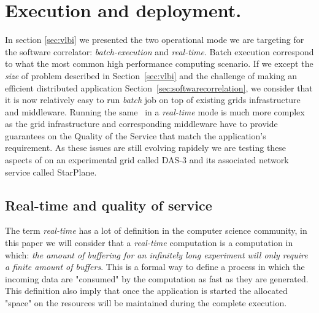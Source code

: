 \section{Execution and deployment.}\label{sec:network}
In section \ref{sec:vlbi} we presented the two operational 
mode we are targeting for the software correlator: \emph{batch-execution} 
and \emph{real-time}. Batch execution correspond to what the most common 
high performance computing scenario. If we except the \emph{size} 
of problem described in Section~\ref{sec:vlbi} and the 
challenge of making an efficient distributed application 
Section~\ref{sec:softwarecorrelation}, we consider that it is now relatively 
easy to run \emph{batch} job on top of existing grids 
infrastructure and middleware. Running the same \scarie~in a 
\emph{real-time} mode is much more complex as the grid 
infrastructure and corresponding middleware have to provide 
guarantees on the Quality of the Service that match 
the application's requirement. As these issues are still 
evolving rapidely we are testing these aspects of \scarie on 
an experimental grid called DAS-3 and its associated network 
service called StarPlane.

\subsection{Real-time and quality of service}
The term \emph{real-time} has a lot of definition in the computer science community, 
in this paper we will consider that a \emph{real-time} computation is a computation 
in which: \emph{the amount of buffering for an infinitely long experiment 
will only require a finite amount of buffers}. This is a formal way to define 
a process in which the incoming data are "consumed" by the computation 
as fast as they are generated. This definition also imply that once 
the application is started the allocated "space" on the resources will 
be maintained during the complete execution. 

